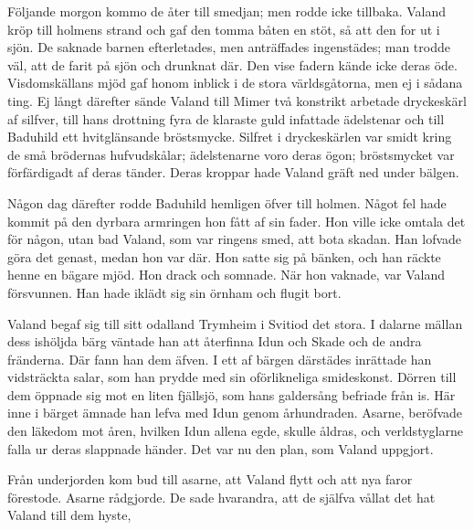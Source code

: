 Följande morgon kommo de åter till smedjan; men rodde icke tillbaka.
Valand kröp till holmens strand och gaf den tomma båten en stöt, så att
den for ut i sjön. De saknade barnen efterletades, men anträffades
ingenstädes; man trodde väl, att de farit på sjön och drunknat där. Den
vise fadern kände icke deras öde. Visdomskällans mjöd gaf honom inblick
i de stora världsgåtorna, men ej i sådana ting. Ej långt därefter sände
Valand till Mimer två konstrikt arbetade dryckeskärl af silfver, till
hans drottning fyra de klaraste guld infattade ädelstenar och till
Baduhild ett hvitglänsande bröstsmycke. Silfret i dryckeskärlen var
smidt kring de små brödernas hufvudskålar; ädelstenarne voro deras ögon;
bröstsmycket var förfärdigadt af deras tänder. Deras kroppar hade Valand
gräft ned under bälgen.

Någon dag därefter rodde Baduhild hemligen öfver till holmen. Något fel
hade kommit på den dyrbara armringen hon fått af sin fader. Hon ville
icke omtala det för någon, utan bad Valand, som var ringens smed, att
bota skadan. Han lofvade göra det genast, medan hon var där. Hon satte
sig på bänken, och han räckte henne en bägare mjöd. Hon drack och
somnade. När hon vaknade, var Valand försvunnen. Han hade iklädt sig sin
örnham och flugit bort.

Valand begaf sig till sitt odalland Trymheim i Svitiod det stora. I
dalarne mällan dess ishöljda bärg väntade han att återfinna Idun och
Skade och de andra fränderna. Där fann han dem äfven. I ett af bärgen
därstädes inrättade han vidsträckta salar, som han prydde med sin
oförlikneliga smideskonst. Dörren till dem öppnade sig mot en liten
fjällsjö, som hans galdersång befriade från is. Här inne i bärget ämnade
han lefva med Idun genom århundraden. Asarne, beröfvade den läkedom mot
åren, hvilken Idun allena egde, skulle åldras, och verldstyglarne falla
ur deras slappnade händer. Det var nu den plan, som Valand uppgjort.

Från underjorden kom bud till asarne, att Valand flytt och att nya faror
förestode. Asarne rådgjorde. De sade hvarandra, att de själfva vållat
det hat Valand till dem hyste,

